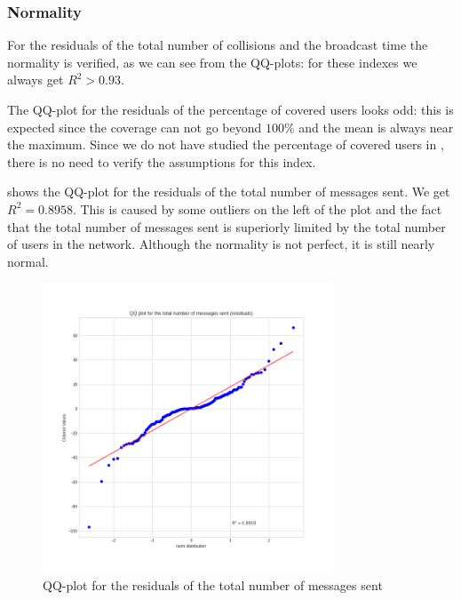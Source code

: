 \subsubsection{Normality}\label{subsubsec:hdassumptionsnormality}

For the residuals of the total number of collisions and the broadcast time the
normality is verified, as we can see from the QQ-plots: for these indexes we
always get \(R^2 > 0.93\).

The QQ-plot for the residuals of the percentage of covered users looks odd: this
is expected since the coverage can not go beyond \(100\%\) and the mean is
always near the maximum. Since we do not have studied the percentage of covered
users in , there is no need to verify the assumptions for
this index.

 shows the QQ-plot for the residuals of the total
number of messages sent. We get \(R^2\!=\!0.8958\). This is caused by some
outliers on the left of the plot and the fact that the total number of messages
sent is superiorly limited by the total number of users in the network. Although
the normality is not perfect, it is still nearly normal.

\begin{figure}[htb]
	\centering
	\includegraphics[width=0.77\textwidth]{img/hd/messages-qq}
	\caption{QQ-plot for the residuals of the total number of messages
	sent}\label{fig:hdmessagesqqplot}
\end{figure}
